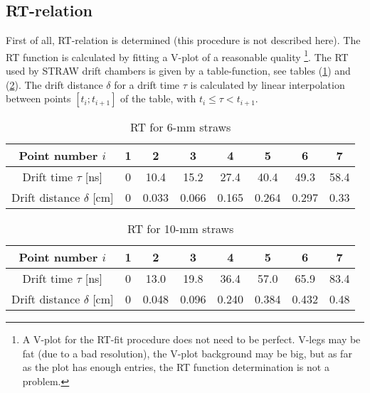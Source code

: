 \documentclass[a4paper,12pt]{article}
\begin{document}
\subsection{RT-relation}
First of all, RT-relation is determined (this procedure is not described here).
The RT function is calculated by fitting a V-plot of a reasonable quality
\footnote{A V-plot for the RT-fit procedure does not need to be perfect. V-legs may be fat
(due to a bad resolution), the V-plot background may be big, but as far as the plot
has enough entries, the RT function determination is not a problem.}.
The RT used by STRAW drift chambers is given by a table-function,
see tables (\ref{RT6mm}) and (\ref{RT10mm}). The drift distance $\delta$ for a drift
time $\tau$ is calculated by linear interpolation between points $[t_i;t_{i+1}]$
of the table, with $t_i \leq \tau<t_{i+1}$.
\begin{table}[ht]
\centering
\caption{RT for 6-mm straws}
\label{RT6mm}
\begin{tabular}{c|ccccccc} \hline
Point number $i$                & 1     &   2       &   3       &   4       &   5       &   6       &   7       \\ \hline
Drift time $\tau$ [ns]         & 0     &   10.4    &   15.2    &   27.4    &   40.4    &   49.3    &   58.4    \\
Drift distance $\delta$ [cm]   & 0     &   0.033   &   0.066   &   0.165   &   0.264   &   0.297   &   0.33    \\
\hline
\end{tabular}
\end{table}

\begin{table}[ht]
\centering
\caption{RT for 10-mm straws}
\label{RT10mm}
\begin{tabular}{c|ccccccc} \hline
Point number $i$                & 1     &   2       &   3       &   4       &   5       &   6       &   7       \\ \hline
Drift time $\tau$ [ns]         & 0     &   13.0    &   19.8    &   36.4    &   57.0    &   65.9    &   83.4    \\
Drift distance $\delta$ [cm]   & 0     &   0.048   &   0.096   &   0.240   &   0.384   &   0.432   &   0.48    \\
\hline
\end{tabular}
\end{table}
\end{document}
